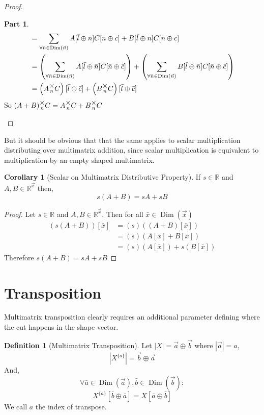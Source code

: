 \documentclass[12pt]{book}
\theoremstyle{plain}
\theoremstyle{definition}
\newtheorem{definition}{Definition}[chapter]
\newtheorem{corollary}{Corollary}[theorem]
\theoremstyle{ppart}
\newtheorem{ppart}{Part}
\theoremstyle{case}
\theoremstyle{solution}
\DeclareMathOperator{\Dim}{Dim}
\newcommand{\mmult}[1]{\text{\raisebox{1ex}{$\underset{#1}{\times}$}}}
\newcommand{\shape}[1]{\left|#1\right|}
\newcommand{\transpose}[2]{{#1}^{\{#2\}}}
\begin{document}
\begin{landscape}
\begin{proof}
\begin{ppart}
\begin{align*}
 &= \sum_{\forall \bar{n} \in \Dim(\vec{n})}
    A[\bar{l} \oplus \bar{n}]C[\bar{n} \oplus \bar{c}]
    +B[\bar{l} \oplus \bar{n}]C[\bar{n} \oplus \bar{c}] \\
 &= \left(\sum_{\forall \bar{n} \in \Dim(\vec{n})}
    A[\bar{l} \oplus \bar{n}]C[\bar{n} \oplus \bar{c}]\right)
    +
    \left(\sum_{\forall \bar{n} \in \Dim(\vec{n})}
    B[\bar{l} \oplus \bar{n}]C[\bar{n} \oplus \bar{c}]\right) \\
 &= \left(A \mmult{n} C\right)[\bar{l} \oplus \bar{c}]
    +\left(B \mmult{n} C\right)[\bar{l} \oplus \bar{c}]
\end{align*}
So $(A+B) \mmult{n} C = A \mmult{n} C + B \mmult{n} C$ 
\end{ppart}
\end{proof}
\end{landscape}

But it should be obvious that that the same applies to scalar 
multiplication distributing over multimatrix addition, since
scalar multiplication is equivalent to multiplication by an
empty shaped multimatrix.

\begin{corollary}[Scalar on Multimatrix Distributive Property]
If $s \in \mathbb{R}$ and $A, B \in \mathbb{R}^{\vec{x}}$ then,
\[ s(A + B) = sA + sB \]
\end{corollary}
\begin{proof}
Let $s \in \mathbb{R}$ and $A, B \in \mathbb{R}^{\vec{x}}$.
Then for all $\bar{x} \in \Dim(\vec{x})$
\begin{align*}
(s(A+B))[\bar{x}]
&= (s)((A+B)[\bar{x}]) \\
&= (s)(A[\bar{x}] + B[\bar{x}]) \\
&= (s)(A[\bar{x}]) + s(B[\bar{x}])
\end{align*}
Therefore $s(A+B) = sA + sB$
\end{proof}

\section{Transposition}

Multimatrix transposition clearly requires an additional parameter defining where
the cut happens in the shape vector.

\begin{definition}[Multimatrix Transposition]
\label{tran_def}
Let $\shape{X} = \vec{a} \oplus \vec{b}$ where $\shape{\vec{a}} = a$,
\[ \shape{\transpose{X}{a}} = \vec{b} \oplus \vec{a} \]
And,
\[ \forall \bar{a} \in \Dim(\vec{a}), \bar{b} \in \Dim(\vec{b}) : \]
\[ \transpose{X}{a}[\bar{b} \oplus \bar{a}] = X[\bar{a} \oplus \bar{b}] \]
We call $a$ the index of transpose.
\end{definition}
\end{document}
